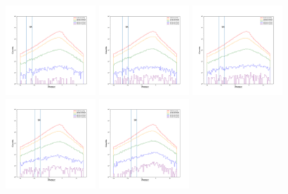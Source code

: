 \documentclass[12pt,prd]{article}
\begin{document}
\begin{figure}[h!]
\centering
\includegraphics[width=0.3\textwidth]{../figures/scanning_plotsgaiascan_l101_2_b58_4_ra212_7_dec55_2_npy_0.pdf}
\includegraphics[width=0.3\textwidth]{../figures/scanning_plotsgaiascan_l101_2_b58_4_ra212_7_dec55_2_npy_1.pdf}
\includegraphics[width=0.3\textwidth]{../figures/scanning_plotsgaiascan_l101_2_b58_4_ra212_7_dec55_2_npy_2.pdf}
\includegraphics[width=0.3\textwidth]{../figures/scanning_plotsgaiascan_l101_2_b58_4_ra212_7_dec55_2_npy_3.pdf}
\includegraphics[width=0.3\textwidth]{../figures/scanning_plotsgaiascan_l101_2_b58_4_ra212_7_dec55_2_npy_4.pdf}

\end{figure}
\end{document}
